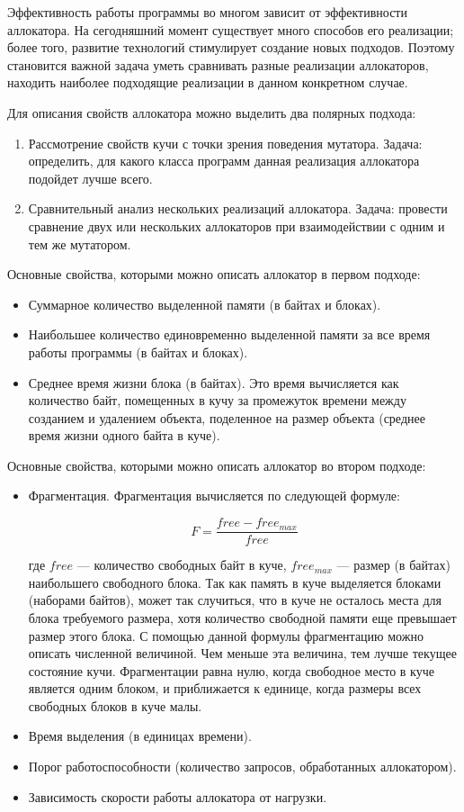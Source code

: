 Эффективность работы программы во многом зависит от эффективности аллокатора. На сегодняшний момент существует много способов его 
реализации; более того, развитие технологий стимулирует создание новых подходов. Поэтому становится важной задача уметь сравнивать разные
реализации аллокаторов, находить наиболее подходящие реализации в данном конкретном случае.
   
Для описания свойств аллокатора можно выделить два полярных подхода:

\begin{enumerate}
 \item Рассмотрение свойств кучи с точки зрения поведения мутатора. Задача: определить, для какого класса программ данная реализация аллокатора 
подойдет лучше всего. 
\item Сравнительный анализ нескольких реализаций аллокатора. Задача: провести сравнение двух или нескольких аллокаторов при взаимодействии с
одним и тем же мутатором.
\end{enumerate}
   
Основные свойства, которыми можно описать аллокатор в первом подходе:

\begin{itemize}
\item Суммарное количество выделенной памяти (в байтах и блоках).
\item Наибольшее количество единовременно выделенной памяти за все время работы программы (в байтах и блоках).
\item Среднее время жизни блока (в байтах). Это время вычисляется как количество байт, помещенных в кучу за промежуток времени между 
созданием и удалением объекта, поделенное на размер объекта (среднее время жизни одного байта в куче).
\end{itemize}
   
Основные свойства, которыми можно описать аллокатор во втором подходе:

\begin{itemize}
\item Фрагментация. Фрагментация вычисляется по следующей формуле: 

$$F = \frac{free - free_{max}}{free}$$

\noindent где $free$ --- количество свободных байт в куче, $free_{max}$ --- размер (в байтах) наибольшего свободного блока.  
Так как память в куче выделяется
блоками (наборами байтов), может так случиться, что в куче не осталось места для блока требуемого размера, хотя количество свободной 
памяти еще превышает размер этого блока. С помощью данной формулы фрагментацию можно описать численной величиной. Чем меньше эта
величина, тем лучше текущее состояние кучи. Фрагментации равна нулю, когда свободное место в 
куче является одним блоком, и приближается к единице, когда размеры всех свободных блоков в куче малы. 
\item Время выделения (в единицах времени).
\item Порог работоспособности (количество запросов, обработанных аллокатором).
\item Зависимость скорости работы аллокатора от нагрузки.
\end{itemize}
    
